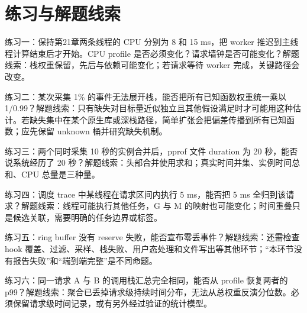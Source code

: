 \documentclass[UTF8,fontset=fandol,openany,11pt]{ctexbook}
\begin{document}
\section{练习与解题线索}

练习一：保持第21章两条线程的 CPU 分别为 8 和 15 ms，把 worker 推迟到主线程计算结束后才开始。CPU profile 是否必须变化？请求墙钟是否可能变化？解题线索：栈权重保留，先后与依赖可能变化；若请求等待 worker 完成，关键路径会改变。


练习二：某次采集 1\% 的事件无法展开栈，能否把所有已知函数权重统一乘以 1/0.99？解题线索：只有缺失对目标量近似独立且其他假设满足时才可能用这种估计。若缺失集中在某个原生库或深栈路径，简单扩张会把偏差传播到所有已知函数；应先保留 unknown 桶并研究缺失机制。


练习三：两个同时采集 10 秒的实例合并后，pprof 文件 duration 为 20 秒，能否说系统经历了 20 秒？解题线索：头部合并使用求和；真实时间并集、实例时间总和、CPU 总量是三种量。\cite{pp-merge}


练习四：调度 trace 中某线程在请求区间内执行 5 ms，能否把 5 ms 全归到该请求？解题线索：线程可能执行其他任务，G 与 M 的映射也可能变化；时间重叠只是候选关联，需要明确的任务边界或标签。


练习五：ring buffer 没有 reserve 失败，能否宣布零丢事件？解题线索：还需检查 hook 覆盖、过滤、采样、栈失败、用户态处理和文件写出等其他环节；“本环节没有报告失败”和“端到端完整”是不同命题。


练习六：同一请求 A 与 B 的调用栈汇总完全相同，能否从 profile 恢复两者的 p99？解题线索：聚合已丢掉请求级持续时间分布，无法从总权重反演分位数。必须保留请求级时间记录，或有另外经过验证的统计模型。
\end{document}
